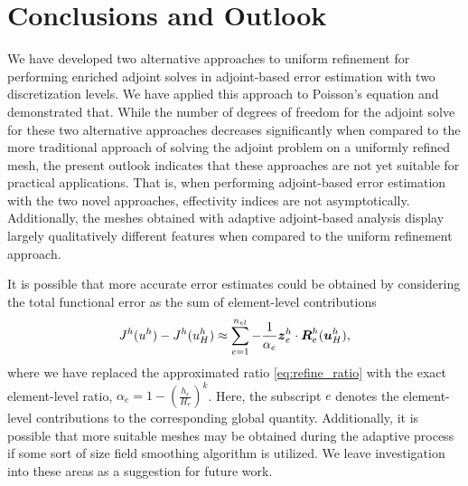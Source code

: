 \section{Conclusions and Outlook}

We have developed two alternative approaches to uniform refinement
for performing enriched adjoint solves in adjoint-based error estimation
with two discretization levels. We have applied this approach to
Poisson's equation and demonstrated that. While the number of
degrees of freedom for the adjoint solve for these two
alternative approaches decreases significantly when compared to the
more traditional approach of solving the adjoint problem on
a uniformly refined mesh, the present outlook indicates that
these approaches are not yet suitable for practical applications.
That is, when performing adjoint-based error estimation with the
two novel approaches, effectivity indices are not asymptotically.
Additionally, the meshes obtained with adaptive adjoint-based
analysis display largely qualitatively different features when
compared to the uniform refinement approach.

It is possible that more accurate error estimates could be
obtained by considering the total functional error as the sum
of element-level contributions
\begin{gather}
J^h(u^h) - J^h(u^h_H) \approx \sum_{e=1}^{n_{el}}
- \frac{1}{\alpha_e} \boldsymbol{z}^h_e \cdot \boldsymbol{R}^h_e(\boldsymbol{u}^h_H),
\end{gather}
where we have replaced the approximated ratio
\eqref{eq:refine_ratio} with the exact element-level
ratio, $\alpha_e = 1 - \left( \frac{h_e}{H_e} \right)^k$. Here, the
subscript $e$ denotes the element-level contributions
to the corresponding global quantity. Additionally, it is
possible that more suitable meshes may be obtained during
the adaptive process if some sort of size field smoothing
algorithm is utilized. We leave investigation into these
areas as a suggestion for future work.
